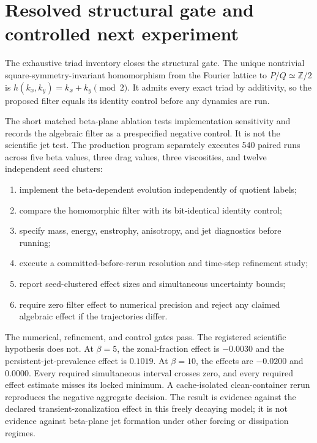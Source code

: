 \section{Resolved structural gate and controlled next experiment}

The exhaustive triad inventory closes the structural gate. The unique
nontrivial square-symmetry-invariant homomorphism from the Fourier lattice to
$P/Q\simeq\mathbb{Z}/2$ is $h(k_x,k_y)=k_x+k_y\pmod 2$. It admits every exact
triad by additivity, so the proposed filter equals its identity control before
any dynamics are run.

The short matched beta-plane ablation tests implementation sensitivity and
records the algebraic filter as a prespecified negative control. It is not the
scientific jet test. The production program separately executes 540 paired
runs across five beta values, three drag values, three viscosities, and twelve
independent seed clusters:

\begin{enumerate}
  \item implement the beta-dependent evolution independently of quotient labels;
  \item compare the homomorphic filter with its bit-identical identity control;
  \item specify mass, energy, enstrophy, anisotropy, and jet diagnostics before
    running;
  \item execute a committed-before-rerun resolution and time-step refinement study;
  \item report seed-clustered effect sizes and simultaneous uncertainty bounds;
  \item require zero filter effect to numerical precision and reject any claimed
    algebraic effect if the trajectories differ.
\end{enumerate}

The numerical, refinement, and control gates pass. The registered scientific
hypothesis does not. At $\beta=5$, the zonal-fraction effect is $-0.0030$ and
the persistent-jet-prevalence effect is $0.1019$. At $\beta=10$, the effects
are $-0.0200$ and $0.0000$. Every required simultaneous interval crosses zero,
and every required effect estimate misses its locked minimum. A cache-isolated
clean-container rerun reproduces the negative aggregate decision. The result is evidence
against the declared transient-zonalization effect in this freely decaying
model; it is not evidence against beta-plane jet formation under other forcing
or dissipation regimes.

